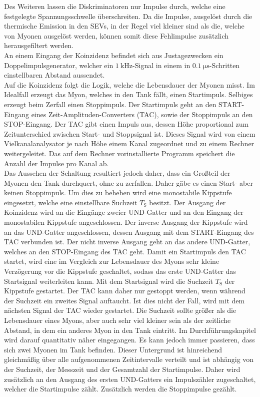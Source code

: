 Des Weiteren lassen die Diskriminatoren nur Impulse durch, welche eine festgelegte Spannungsschwelle überschreiten.
Da die Impulse, ausgelöst durch die thermische Emission in den SEVs, in der Regel viel kleiner sind als die, welche von Myonen ausgelöst werden, können somit diese Fehlimpulse zusätzlich herausgefiltert werden.\\
An einem Eingang der Koinzidenz befindet sich aus Justagezwecken ein Doppelimpulsgenerator, welcher ein $\SI{1}{\kilo\hertz}$-Signal in einem in $\SI{0,1}{\micro\second}$-Schritten einstellbaren Abstand aussendet.\\
Auf die Koinzidenz folgt die Logik, welche die Lebensdauer der Myonen misst.
Im Idealfall erzeugt das Myon, welches in den Tank fällt, einen Startimpuls.
Selbiges erzeugt beim Zerfall einen Stoppimpuls.
Der Startimpuls geht an den START-Eingang eines Zeit-Amplituden-Converters (TAC), sowie der Stoppimpuls an den STOP-Eingang.
Der TAC gibt einen Impuls aus, dessen Höhe proportional zum Zeitunterschied zwischen Start- und Stoppsignal ist.
Dieses Signal wird von einem Vielkanalanalysator je nach Höhe einem Kanal zugeordnet und zu einem Rechner weitergeleitet.
Das auf dem Rechner vorinstallierte Programm speichert die Anzahl der Impulse pro Kanal ab.\\
Das Aussehen der Schaltung resultiert jedoch daher, dass ein Großteil der Myonen den Tank durchquert, ohne zu zerfallen.
Daher gäbe es einen Start- aber keinen Stoppimpuls.
Um dies zu beheben wird eine monostabile Kippstufe eingesetzt, welche eine einstellbare Suchzeit $T_\text{S}$ besitzt.
Der Ausgang der Koinzidenz wird an die Eingänge zweier UND-Gatter und an den Eingang der monostabilen Kippstufe angeschlossen.
Der inverse Ausgang der Kippstufe wird an das UND-Gatter angeschlossen, dessen Ausgang mit dem START-Eingang des TAC verbunden ist.
Der nicht inverse Ausgang geht an das andere UND-Gatter, welches an den STOP-Eingang des TAC geht.
Damit ein Startimpuls den TAC startet, wird eine im Vergleich zur Lebensdauer des Myons sehr kleine Verzögerung vor die Kippstufe geschaltet, sodass das erste UND-Gatter das Startsignal weiterleiten kann.
Mit dem Startsignal wird die Suchzeit $T_\text{S}$ der Kippstufe gestartet.
Der TAC kann daher nur gestoppt werden, wenn während der Suchzeit ein zweites Signal auftaucht.
Ist dies nicht der Fall, wird mit dem nächsten Signal der TAC wieder gestartet.
Die Suchzeit sollte größer als die Lebensdauer eines Myons, aber auch sehr viel kleiner sein als der zeitliche Abstand, in dem ein anderes Myon in den Tank eintritt.
Im Durchführungskapitel wird darauf quantitativ näher eingegangen.
Es kann jedoch immer passieren, dass sich zwei Myonen im Tank befinden.
Dieser Untergrund ist hinreichend gleichmäßig über alle aufgenommenen Zeitintervalle verteilt und ist abhängig von der Suchzeit, der Messzeit und der Gesamtzahl der Startimpulse.
Daher wird zusätzlich an den Ausgang des ersten UND-Gatters ein Impulszähler zugeschaltet, welcher die Startimpulse zählt.
Zusätzlich werden die Stoppimpulse gezählt.
